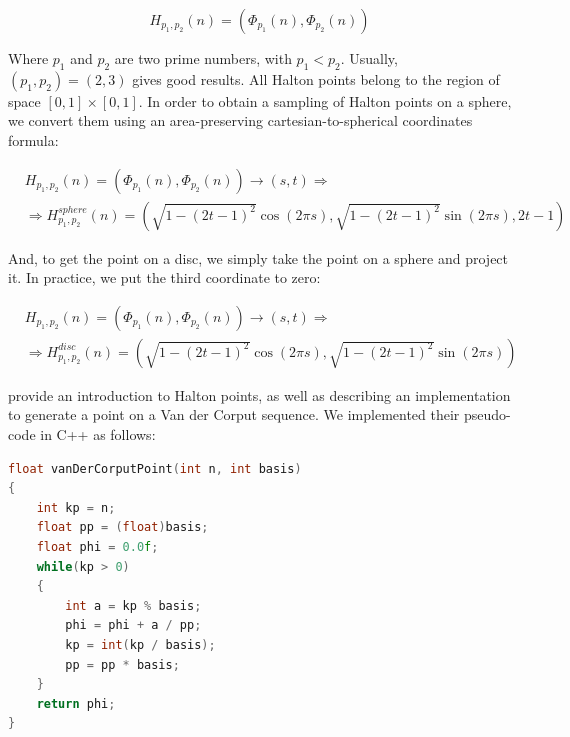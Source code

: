 $$
H_{p_1,p_2}(n) = (\Phi_{p_1}(n), \Phi_{p_2}(n))
$$ 

Where $p_1$ and $p_2$ are two prime numbers, with $p_1 < p_2$. Usually, $(p_1,p_2) = (2,3)$ gives good results. All Halton points belong to the region of space $[0,1]\times[0,1]$. In order to obtain a sampling of Halton points on a sphere, we convert them using an area-preserving cartesian-to-spherical coordinates formula:

\begin{equation*}
\begin{split}
&H_{p_1,p_2}(n) = (\Phi_{p_1}(n), \Phi_{p_2}(n)) \rightarrow (s,t) \Rightarrow \\
&\Rightarrow H^{sphere}_{p_1,p_2}(n) = (\sqrt{1 - (2t - 1) ^2} \cos(2\pi s),\sqrt{1 - (2t - 1) ^2} \sin(2\pi s), 2t-1) 
\end{split}
\end{equation*}

And, to get the point on a disc, we simply take the point on a sphere and project it. In practice, we put the third coordinate to zero:

\begin{equation*}
\begin{split}
&H_{p_1,p_2}(n) = (\Phi_{p_1}(n), \Phi_{p_2}(n)) \rightarrow (s,t) \Rightarrow\\
& \Rightarrow H^{disc}_{p_1,p_2}(n) = (\sqrt{1 - (2t - 1) ^2} \cos(2\pi s),\sqrt{1 - (2t - 1) ^2} \sin(2\pi s)) 
\end{split}
\end{equation*}

\cite{journals/jgtools/WongLH97} provide an introduction to Halton points, as well as describing an implementation to generate a point on a Van der Corput sequence. We implemented their pseudo-code in C++ as follows:

\begin{lstlisting}[language=C++,label=lst:vandercorput,caption={Generating the p-adic Van der Corput point.}]
float vanDerCorputPoint(int n, int basis)
{
    int kp = n;
    float pp = (float)basis;
    float phi = 0.0f;
    while(kp > 0)
    {
        int a = kp % basis;
        phi = phi + a / pp;
        kp = int(kp / basis);
        pp = pp * basis;
    }
    return phi;
}
\end{lstlisting}

